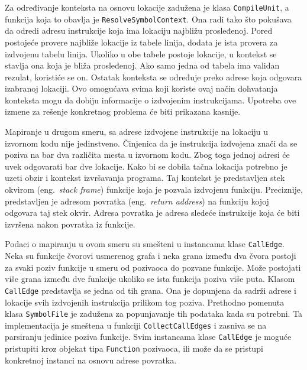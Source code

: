 \documentclass[12pt,oneside]{memoir}
\begin{document}
Za određivanje konteksta na osnovu lokacije zadužena je klasa \verb|CompileUnit|, a funkcija koja to obavlja je \verb|ResolveSymbolContext|.
Ona radi tako što pokušava da odredi adresu instrukcije koja ima lokaciju najbližu prosleđenoj.
Pored postojeće provere najbliže lokacije iz tabele linija, dodata je ista provera za izdvojenu tabelu linija.
Ukoliko u obe tabele postoje lokacije, u kontekst se stavlja ona koja je bliža prosleđenoj.
Ako samo jedna od tabela ima validan rezulat, koristiće se on.
Ostatak konteksta se određuje preko adrese koja odgovara izabranoj lokaciji.
Ovo omogućava svima koji koriste ovaj način dohvatanja konteksta mogu da dobiju informacije o izdvojenim instrukcijama.
Upotreba ove izmene za rešenje konkretnog problema će biti prikazana kasnije.

Mapiranje u drugom smeru, sa adrese izdvojene instrukcije na lokaciju u izvornom kodu nije jedinstveno.
Činjenica da je instrukcija izdvojena znači da se poziva na bar dva različita mesta u izvornom kodu.
Zbog toga jednoj adresi će uvek odgovarati bar dve lokacije. 
Kako bi se dobila tačna lokacija potrebno je uzeti obzir i kontekst izvršavanja programa.
Taj kontekst je predstavljen stek okvirom (eng.~{\em stack frame}) funkcije koja je pozvala izdvojenu funkciju.
Preciznije, predstavljen je adresom povratka (eng.~{\em return address}) na funkciju kojoj odgovara taj stek okvir.
Adresa povratka je adresa sledeće instrukcije koja će biti izvršena nakon povratka iz funkcije.

Podaci o mapiranju u ovom smeru su smešteni u instancama klase \verb|CallEdge|.
Neka su funkcije čvorovi usmerenog grafa i neka grana između dva čvora postoji za svaki poziv funkcije u smeru od pozivaoca do pozvane funkcije.
Može postojati više grana između dve funkcije ukoliko se ista funkcija poziva više puta.
Klasom \verb|CallEdge| predstavlja se jedna od tih grana.
Ona je dopunjena da sadrži adrese i lokacije svih izdvojenih instrukcija prilikom tog poziva.
Prethodno pomenuta klasa \verb|SymbolFile| je zadužena za popunjavanje tih podataka kada su potrebni.
Ta implementacija je smeštena u funkciji \verb|CollectCallEdges| i zasniva se na parsiranju jedinice poziva funkcije.
Svim instancama klase \verb|CallEdge| je moguće pristupiti kroz objekat tipa \verb|Function| pozivaoca, ili može da se pristupi konkretnoj instanci na osnovu adrese povratka.
\end{document}

